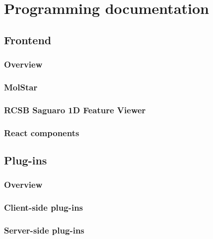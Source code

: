 \chapter{Programming documentation}
\label{chap:prog_docs}


\section{Frontend}
\label{sec:frontend}

\subsection{Overview}

\subsection{MolStar}

\subsection{RCSB Saguaro 1D Feature Viewer}

\subsection{React components}

\section{Plug-ins}
\label{sec:plugins}

\subsection{Overview}

\subsection{Client-side plug-ins}

\subsection{Server-side plug-ins}